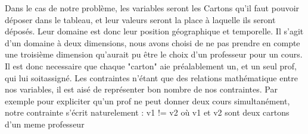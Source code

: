 \indent

Dans le cas de notre problème, les variables seront les Cartons qu'il faut pouvoir déposer dans le tableau, et leur valeurs seront la place à laquelle ils seront déposés.
Leur domaine est donc leur position géographique et temporelle. 
Il s'agit d'un domaine à deux dimensions, nous avons choisi de ne pas prendre en compte une troisième dimension qu'aurait pu être le choix 
d'un professeur pour un cours. 
Il est donc necessaire que chaque "carton" aie préalablement un, et un seul prof, qui lui soitassigné.
Les contraintes n'étant que des relations mathématique entre nos variables, il est aisé de représenter bon nombre de nos contraintes. 
Par exemple pour expliciter qu'un prof ne peut donner deux cours simultanément, notre contrainte s'écrit naturelement :
v1 != v2 où v1 et v2 sont deux cartons d'un meme professeur
% 
% 
